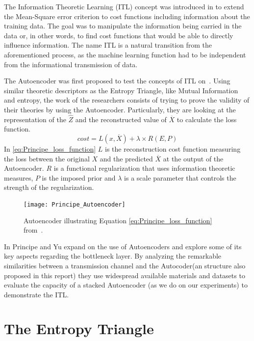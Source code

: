 The Information Theoretic Learning (ITL) concept was introduced in \cite{Principe_2000} to extend the Mean-Square error criterion to cost functions including information about the training data. The goal was to manipulate the information being carried in the data or, in other words, to find cost functions that would be able to directly influence information. The name ITL is a natural transition from the aforementioned process, as the machine learning function had to be independent from the informational transmission of data. 


The Autoencoder was first proposed to test the concepts of ITL on~\cite{Santana_2016}. Using similar theoretic descriptors as the Entropy Triangle, like Mutual Information and entropy, the work of the researchers consists of trying to prove the validity of their theories by using the Autoencoder. Particularly, they are looking at the representation of the $\hat{Z}$ and the reconstructed value of $\overline{X}$ to calculate the loss function.
\begin{equation}
\label{eq:Principe_loss_function}
cost = L(x,\overline{X}) + \lambda \times R(E,P)
\end{equation}
In \eqref{eq:Principe_loss_function} $L$ is the reconstruction cost function measuring the loss between the original $X$ and the predicted $\overline{X}$ at the output of the Autoencoder. $R$ is a functional regularization that uses information theoretic measures, $P$ is the imposed prior and $\lambda$ is a scale parameter that controls the strength of the regularization.

\begin{figure}[H]
	\centering	
	\texttt{[image: Principe\_Autoencoder]}
	\caption{Autoencoder illustrating Equation \ref{eq:Principe_loss_function} from~\protect\cite{Santana_2016}.}
	\label{fig:figure_autoencoder2}
\end{figure} 

In \cite{Yu_2019} Principe and Yu expand on the use of Autoencoders and explore some of its key aspects regarding the bottleneck layer. By analyzing the remarkable similarities between a transmission channel and the Autocoder(an structure also proposed in this report) they use widespread available materials and datasets to evaluate the capacity of a stacked Autoencoder (as we do on our experiments) to demonstrate the ITL. 

\section{The Entropy Triangle}
